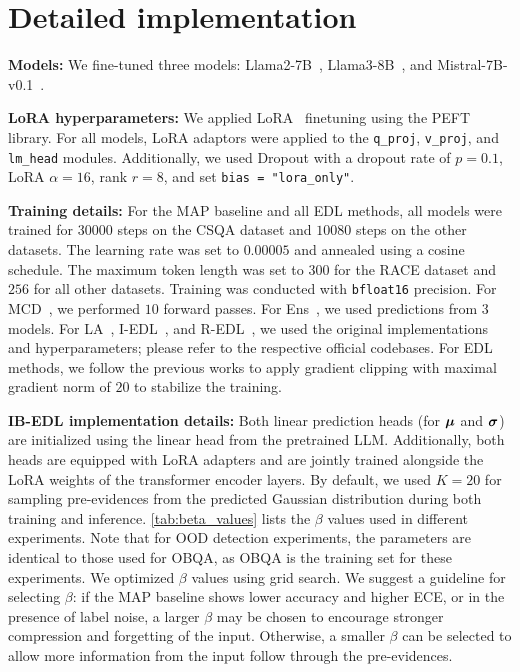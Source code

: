 \newpage

\section{Detailed implementation}\label{sec:app:implementation}

\textbf{Models:} We fine-tuned three models: Llama2-7B~\citep{touvron2023llama}, Llama3-8B~\citep{dubey2024llama3herdmodels}, and Mistral-7B-v0.1~\citep{jiang2023mistral7b}.

\textbf{LoRA hyperparameters:} We applied LoRA~\citep{hu2022lora} finetuning using the PEFT~\citep{mangrulkar2022peft} library. For all models, LoRA adaptors were applied to the \texttt{q\_proj}, \texttt{v\_proj}, and \texttt{lm\_head} modules. Additionally, we used Dropout with a dropout rate of $p = 0.1$, LoRA $\alpha = 16$, rank $r = 8$, and set \texttt{bias = "lora\_only"}.

\textbf{Training details:} For the MAP baseline and all EDL methods, all models were trained for $30000$ steps on the CSQA dataset and $10080$ steps on the other datasets. The learning rate was set to $0.00005$ and annealed using a cosine schedule. The maximum token length was set to $300$ for the RACE dataset and $256$ for all other datasets. Training was conducted with \texttt{bfloat16} precision. For MCD~\citep{gal2016dropout}, we performed $10$ forward passes. For Ens~\citep{lakshminarayanan2017simple,fort2019deep}, we used predictions from 3 models. For LA~\citep{yang2024lalora}, I-EDL~\citep{deng2023uncertainty}, and R-EDL~\citep{chen2024redl}, we used the original implementations and hyperparameters; please refer to the respective official codebases. For EDL methods, we follow the previous works to apply gradient clipping with maximal gradient norm of $20$ to stabilize the training.

\textbf{IB-EDL implementation details:} Both linear prediction heads (for $\bm{\mu}$ and $\bm{\sigma}$) are initialized using the linear head from the pretrained LLM. Additionally, both heads are equipped with LoRA adapters and are jointly trained alongside the LoRA weights of the transformer encoder layers. By default, we used $K=20$ for sampling pre-evidences from the predicted Gaussian distribution during both training and inference. \cref{tab:beta_values} lists the $\beta$ values used in different experiments. Note that for OOD detection experiments, the parameters are identical to those used for OBQA, as OBQA is the training set for these experiments. We optimized $\beta$ values using grid search. We suggest a guideline for selecting $\beta$: if the MAP baseline shows lower accuracy and higher ECE, or in the presence of label noise, a larger $\beta$ may be chosen to encourage stronger compression and forgetting of the input. Otherwise, a smaller $\beta$ can be selected to allow more information from the input follow through the pre-evidences.

